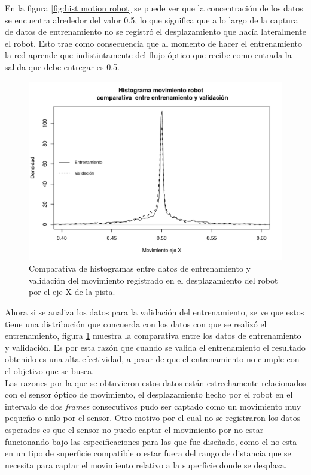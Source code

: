 \documentclass{iccmemoria}
\begin{document}
En la figura \ref{fig:hist motion robot} se puede ver que la concentración de los datos se encuentra alrededor del valor 0.5, lo que significa que a lo largo de la captura de datos de entrenamiento no se registró el desplazamiento que hacía lateralmente el robot. Esto trae como consecuencia que al momento de hacer el entrenamiento la red aprende que indistintamente del flujo óptico que recibe como entrada la salida que debe entregar es 0.5.\\

\begin{figure}[H]
  \centering
  \includegraphics[width = 450pt]{images/hist_motion_robot_training_vs_test.pdf}
  \caption[Histograma movimiento robot entrenamiento v/s validación]{Comparativa de histogramas entre datos de entrenamiento y validación del movimiento registrado en el desplazamiento del robot por el eje X de la pista.}
  \label{fig:hist motion robot training test}
\end{figure}

Ahora si se analiza los datos para la validación del entrenamiento, se ve que estos tiene una distribución que concuerda con los datos con que se realizó el entrenamiento, figura \ref{fig:hist motion robot training test} muestra la comparativa entre los datos de entrenamiento y validación. Es por esta razón que cuando se valida el entrenamiento el resultado obtenido es una alta efectividad, a pesar de que el entrenamiento no cumple con el objetivo que se busca.\\

Las razones por la que se obtuvieron estos datos están estrechamente relacionados con el sensor óptico de movimiento, el desplazamiento hecho por el robot en el intervalo de dos \emph{frames} consecutivos pudo ser captado como un movimiento muy pequeño o nulo por el sensor. Otro motivo por el cual no se registraron los datos esperados es que el sensor no puedo captar el movimiento por no estar funcionando bajo las especificaciones para las que fue diseñado, como el no esta en un tipo de superficie compatible o estar fuera del rango de distancia que se necesita para captar el movimiento relativo a la superficie donde se desplaza.\\
\end{document}
